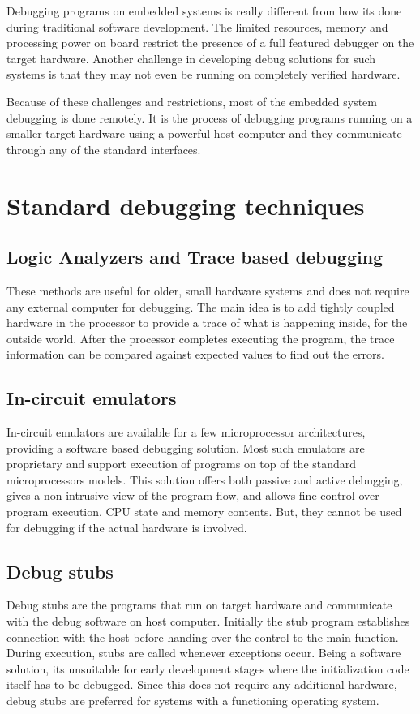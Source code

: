
Debugging programs on embedded systems is really different from how its done during traditional software development. The limited resources, memory and processing power on board restrict the presence of a full featured debugger on the target hardware. Another challenge in developing debug solutions for such systems is that they may not even be running on completely verified hardware.

Because of these challenges and restrictions, most of the embedded system debugging is done remotely. It is the process of debugging programs running on a smaller target hardware using a powerful host computer and they communicate through any of the standard interfaces.

\section{Standard debugging techniques}
\subsection{Logic Analyzers and Trace based debugging}
These methods are useful for older, small hardware systems and does not require any external computer for debugging. The main idea is to add tightly coupled hardware in the processor to provide a trace of what is happening inside, for the outside world. After the processor completes executing the program, the trace information can be compared against expected values to find out the errors.

\subsection{In-circuit emulators}
In-circuit emulators are available for a few microprocessor architectures, providing a software based debugging solution. Most such emulators are proprietary and support execution of programs on top of the standard microprocessors models. This solution offers both passive and active debugging, gives a non-intrusive view of the program flow, and allows fine control over program execution, CPU state and memory contents. But, they cannot be used for debugging if the actual hardware is involved.

\subsection{Debug stubs}
Debug stubs are the programs that run on target hardware and communicate with the debug software on host computer. Initially the stub program establishes connection with the host before handing over the control to the main function. During execution, stubs are called whenever exceptions occur. Being a software solution, its unsuitable for early development stages where the initialization code itself has to be debugged. Since this does not require any additional hardware, debug stubs are preferred for systems with a functioning operating system.

